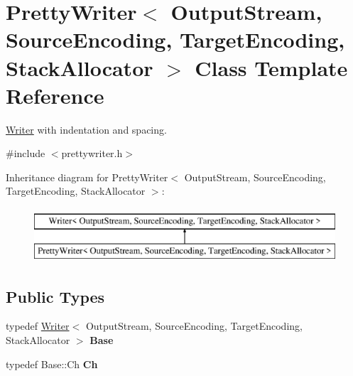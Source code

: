\hypertarget{class_pretty_writer}{}\section{Pretty\+Writer$<$ Output\+Stream, Source\+Encoding, Target\+Encoding, Stack\+Allocator $>$ Class Template Reference}
\label{class_pretty_writer}


\hyperlink{class_writer}{Writer} with indentation and spacing.  




{\ttfamily \#include $<$prettywriter.\+h$>$}

Inheritance diagram for Pretty\+Writer$<$ Output\+Stream, Source\+Encoding, Target\+Encoding, Stack\+Allocator $>$\+:\begin{figure}[H]
\begin{center}
\leavevmode
\includegraphics[height=2.000000cm]{class_pretty_writer}
\end{center}
\end{figure}
\subsection*{Public Types}
\begin{DoxyCompactItemize}
\item 
typedef \hyperlink{class_writer}{Writer}$<$ Output\+Stream, Source\+Encoding, Target\+Encoding, Stack\+Allocator $>$ {\bfseries Base}\hypertarget{class_pretty_writer_ab6074f4c51db129e195bc5752eb2b448}{}\label{class_pretty_writer_ab6074f4c51db129e195bc5752eb2b448}

\item 
typedef Base\+::\+Ch {\bfseries Ch}\hypertarget{class_pretty_writer_ae5f474c0f087932d795c1cb4b9d0c312}{}\label{class_pretty_writer_ae5f474c0f087932d795c1cb4b9d0c312}

\end{DoxyCompactItemize}
